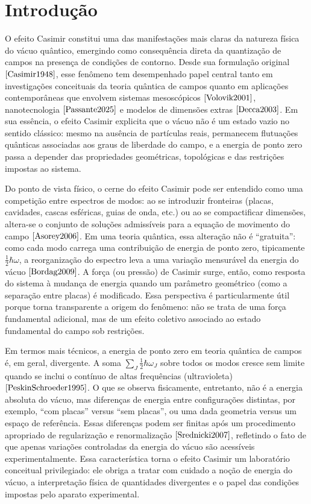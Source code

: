 \chapter*{Introdução}
O efeito Casimir constitui uma das manifestações mais claras da natureza física do vácuo quântico, emergindo como consequência direta da quantização de campos na presença de condições de contorno. Desde sua formulação original $\cite{Casimir1948}$, esse fenômeno tem desempenhado papel central tanto em investigações conceituais da teoria quântica de campos quanto em aplicações contemporâneas que envolvem sistemas mesoscópicos $\cite{Volovik2001}$, nanotecnologia $\cite{Passante2025}$ e modelos de dimensões extras $\cite{Decca2003}$. Em sua essência, o efeito Casimir explicita que o vácuo não é um estado vazio no sentido clássico: mesmo na ausência de partículas reais, permanecem flutuações quânticas associadas aos graus de liberdade do campo, e a energia de ponto zero passa a depender das propriedades geométricas, topológicas e das restrições impostas ao sistema.

Do ponto de vista físico, o cerne do efeito Casimir pode ser entendido como uma competição entre espectros de modos: ao se introduzir fronteiras (placas, cavidades, cascas esféricas, guias de onda, etc.) ou ao se compactificar dimensões, altera-se o conjunto de soluções admissíveis para a equação de movimento do campo $\cite{Asorey2006}$. Em uma teoria quântica, essa alteração não é “gratuita”: como cada modo carrega uma contribuição de energia de ponto zero, tipicamente $\tfrac{1}{2}\hbar\omega$, a reorganização do espectro leva a uma variação mensurável da energia do vácuo $\cite{Bordag2009}$. A força (ou pressão) de Casimir surge, então, como resposta do sistema à mudança de energia quando um parâmetro geométrico (como a separação entre placas) é modificado. Essa perspectiva é particularmente útil porque torna transparente a origem do fenômeno: não se trata de uma força fundamental adicional, mas de um efeito coletivo associado ao estado fundamental do campo sob restrições.

Em termos mais técnicos, a energia de ponto zero em teoria quântica de campos é, em geral, divergente. A soma $\sum_J \tfrac{1}{2}\hbar\omega_J$ sobre todos os modos cresce sem limite quando se inclui o contínuo de altas frequências (ultravioleta) $\cite{PeskinSchroeder1995}$. O que se observa fisicamente, entretanto, não é a energia absoluta do vácuo, mas diferenças de energia entre configurações distintas, por exemplo, “com placas” versus “sem placas”, ou uma dada geometria versus um espaço de referência. Essas diferenças podem ser finitas após um procedimento apropriado de regularização e renormalização $\cite{Srednicki2007}$, refletindo o fato de que apenas variações controladas da energia do vácuo são acessíveis experimentalmente. Essa característica torna o efeito Casimir um laboratório conceitual privilegiado: ele obriga a tratar com cuidado a noção de energia do vácuo, a interpretação física de quantidades divergentes e o papel das condições impostas pelo aparato experimental.

